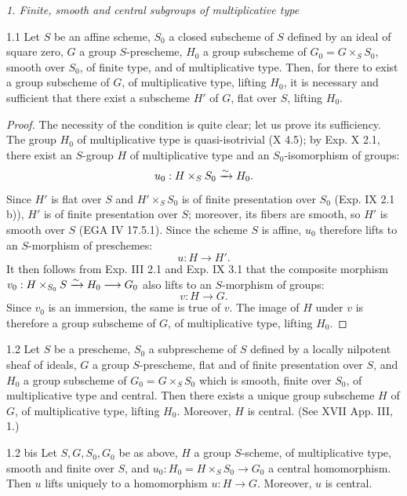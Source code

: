 \par\medskip\noindent\textit{1. Finite, smooth and central subgroups of multiplicative type}\par
\begin{proposition}{1.1}\label{XV.1.1}
Let $S$ be an affine scheme, $S_0$ a closed subscheme of $S$ defined by an ideal of square zero, $G$ a group $S$-prescheme, $H_0$ a group subscheme of $G_0=G\times_S S_0$, smooth over $S_0$, of finite type, and of multiplicative type. Then, for there to exist a group subscheme of $G$, of multiplicative type, lifting $H_0$, it is necessary and sufficient that there exist a subscheme $H'$ of $G$, flat over $S$, lifting $H_0$.
\end{proposition}
\begin{proof}
The necessity of the condition is quite clear; let us prove its sufficiency. The group $H_0$ of multiplicative type is quasi-isotrivial (X 4.5); by Exp. X 2.1, there exist an $S$-group $H$ of multiplicative type and an $S_0$-isomorphism of groups:
\[
u_0:H\times_S S_0\xrightarrow{\sim} H_0.
\]
Since $H'$ is flat over $S$ and $H'\times_S S_0$ is of finite presentation over $S_0$ (Exp. IX 2.1 b)), $H'$ is of finite presentation over $S$; moreover, its fibers are smooth, so $H'$ is smooth over $S$ (EGA IV 17.5.1). Since the scheme $S$ is affine, $u_0$ therefore lifts to an $S$-morphism of preschemes:
\[
u:H\to H'.
\]
It then follows from Exp. III 2.1 and Exp. IX 3.1 that the composite morphism $v_0:H\times_{S_0}S\xrightarrow{\sim} H_0\longrightarrow G_0$ also lifts to an $S$-morphism of groups:
\[
v:H\to G.
\]
Since $v_0$ is an immersion, the same is true of $v$. The image of $H$ under $v$ is therefore a group subscheme of $G$, of multiplicative type, lifting $H_0$.
\end{proof}

\begin{proposition}{1.2}\label{XV.1.2}
Let $S$ be a prescheme, $S_0$ a subprescheme of $S$ defined by a locally nilpotent sheaf of ideals, $G$ a group $S$-prescheme, flat and of finite presentation over $S$, and $H_0$ a group subscheme of $G_0=G\times_S S_0$ which is smooth, finite over $S_0$, of multiplicative type and central. Then there exists a unique group subscheme $H$ of $G$, of multiplicative type, lifting $H_0$. Moreover, $H$ is central. (See XVII App. III, 1.)
\end{proposition}

\begin{proposition}{1.2 bis}\label{XV.1.2bis}
Let $S,G,S_0,G_0$ be as above, $H$ a group $S$-scheme, of multiplicative type, smooth and finite over $S$, and $u_0:H_0=H\times_S S_0\to G_0$ a central homomorphism. Then $u$ lifts uniquely to a homomorphism $u:H\to G$. Moreover, $u$ is central.
\end{proposition}

